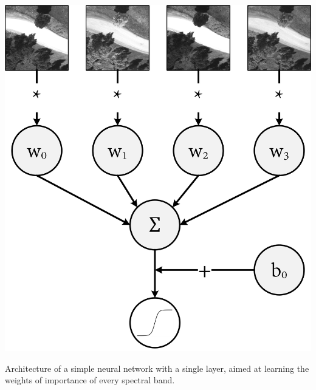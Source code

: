 \begin{marginfigure}[1.5cm]
    \centering
    \includegraphics{figs/fundamentals/cnn_ndvi.png}
    \caption{Architecture of a simple neural network with a single layer, aimed at learning the weights of importance of every spectral band.}
    \label{fig:cnn_dvi}
\end{marginfigure}
